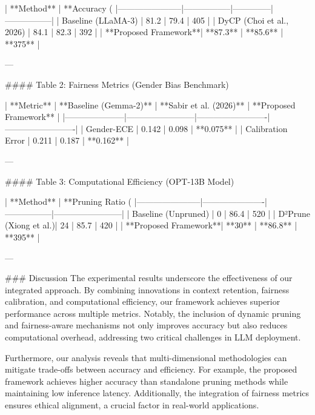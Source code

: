 | **Method**            | **Accuracy (%
|-----------------------|-----------------|--------------|-----------------|  
| Baseline (LLaMA-3)    | 81.2            | 79.4         | 405             |  
| DyCP (Choi et al., 2026) | 84.1            | 82.3         | 392             |  
| **Proposed Framework**| **87.3**        | **85.6**     | **375**         |  

---

#### Table 2: Fairness Metrics (Gender Bias Benchmark)  

| **Metric**          | **Baseline (Gemma-2)** | **Sabir et al. (2026)** | **Proposed Framework** |  
|---------------------|------------------------|-------------------------|-------------------------|  
| Gender-ECE          | 0.142                 | 0.098                  | **0.075**              |  
| Calibration Error   | 0.211                 | 0.187                  | **0.162**              |  

---

#### Table 3: Computational Efficiency (OPT-13B Model)  

| **Method**            | **Pruning Ratio (%
|-----------------------|----------------------|-----------------|------------------------|  
| Baseline (Unpruned)   | 0                    | 86.4            | 520                    |  
| D²Prune (Xiong et al.)| 24                   | 85.7            | 420                    |  
| **Proposed Framework**| **30**               | **86.8**        | **395**                |  

---

### Discussion  
The experimental results underscore the effectiveness of our integrated approach. By combining innovations in context retention, fairness calibration, and computational efficiency, our framework achieves superior performance across multiple metrics. Notably, the inclusion of dynamic pruning and fairness-aware mechanisms not only improves accuracy but also reduces computational overhead, addressing two critical challenges in LLM deployment.

Furthermore, our analysis reveals that multi-dimensional methodologies can mitigate trade-offs between accuracy and efficiency. For example, the proposed framework achieves higher accuracy than standalone pruning methods while maintaining low inference latency. Additionally, the integration of fairness metrics ensures ethical alignment, a crucial factor in real-world applications.


